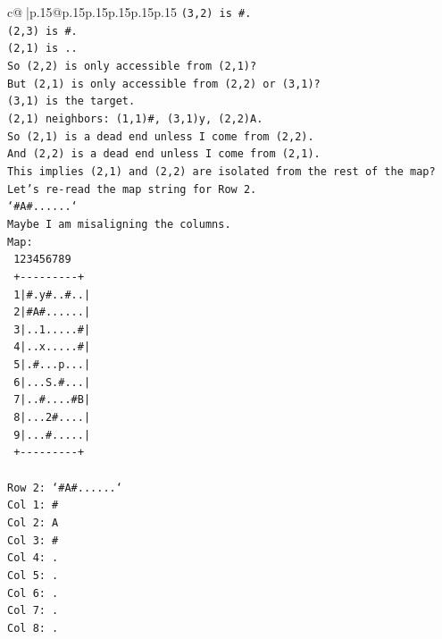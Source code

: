 \documentclass{article}
\begin{document}
{\begin{supertabular}{c@{$\;$}|p{.15\linewidth}@{}p{.15\linewidth}p{.15\linewidth}p{.15\linewidth}p{.15\linewidth}p{.15\linewidth}}
{{{\texttt{(3,2) is \#.} \\
\texttt{(2,3) is \#.} \\
\texttt{(2,1) is ..} \\
\texttt{So (2,2) is only accessible from (2,1)?} \\
\texttt{But (2,1) is only accessible from (2,2) or (3,1)?} \\
\texttt{(3,1) is the target.} \\
\texttt{(2,1) neighbors: (1,1)\#, (3,1)y, (2,2)A.} \\
\texttt{So (2,1) is a dead end unless I come from (2,2).} \\
\texttt{And (2,2) is a dead end unless I come from (2,1).} \\
\texttt{This implies (2,1) and (2,2) are isolated from the rest of the map?} \\
\texttt{Let's re{-}read the map string for Row 2.} \\
\texttt{`\#A\#......`} \\
\texttt{Maybe I am misaligning the columns.} \\
\texttt{Map:} \\
\texttt{   123456789} \\
\texttt{  +{-}{-}{-}{-}{-}{-}{-}{-}{-}+} \\
\texttt{ 1|\#.y\#..\#..|} \\
\texttt{ 2|\#A\#......|} \\
\texttt{ 3|..1.....\#|} \\
\texttt{ 4|..x.....\#|} \\
\texttt{ 5|.\#...p...|} \\
\texttt{ 6|...S.\#...|} \\
\texttt{ 7|..\#....\#B|} \\
\texttt{ 8|...2\#....|} \\
\texttt{ 9|...\#.....|} \\
\texttt{  +{-}{-}{-}{-}{-}{-}{-}{-}{-}+} \\
\\ 
\texttt{Row 2: `\#A\#......`} \\
\texttt{Col 1: \#} \\
\texttt{Col 2: A} \\
\texttt{Col 3: \#} \\
\texttt{Col 4: .} \\
\texttt{Col 5: .} \\
\texttt{Col 6: .} \\
\texttt{Col 7: .} \\
\texttt{Col 8: .} \\
}}}
\end{supertabular}}
\end{document}
